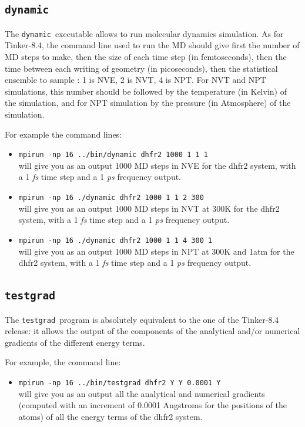 \documentclass[peerreview]{IEEEtran}
\def\dynamic{\texttt{dynamic}}
\def\testgrad{\texttt{testgrad}}
\def\mpirun{\texttt{mpirun -np}}
\begin{document}
\subsection{\dynamic\ }
The \dynamic\ executable allows to run molecular dynamics simulation. As for Tinker-8.4, the command line used to run the MD should give first the number of MD steps to make, then the size of each time step (in femtoseconds), then the time between each writing of geometry (in picoseconds), then the statistical ensemble to sample : 1 is NVE, 2 is NVT, 4 is NPT. For NVT and NPT simulations, this number should be followed by the temperature (in Kelvin) of the simulation, and for NPT simulation by the pressure (in Atmosphere) of the simulation.

For example the command lines:
\begin{itemize}
    \item[] \mpirun\texttt{  16 ../bin/dynamic dhfr2 1000 1 1 1} \\
    will give you as an output 1000 MD steps in NVE for the dhfr2 system, with a 1  {\em fs} time step and a 1 {\em ps} frequency output.
    \item[] \mpirun\texttt{  16 ./dynamic dhfr2 1000 1 1 2 300} \\
    will give you as an output 1000 MD steps in NVT at 300K for the dhfr2 system, with a 1  {\em fs} time step and a 1  {\em ps} frequency output.
    \item[] \mpirun\texttt{  16 ./dynamic dhfr2 1000 1 1 4 300 1} \\
    will give you as an output 1000 MD steps in NPT at 300K and 1atm for the dhfr2 system, with a 1  {\em fs} time step and a 1  {\em ps} frequency output.
\end{itemize}
\subsection{\testgrad\ }
The \testgrad\ program is absolutely equivalent to the one of the Tinker-8.4 release: it allows the output of the components of the analytical and/or numerical gradients of the different energy terms.

For example, the command line:
\begin{itemize}
\item []\mpirun\texttt{  16 ../bin/testgrad dhfr2 Y Y 0.0001 Y} \\
will give you as an output all the analytical and numerical gradients (computed with an increment of 0.0001 Angstroms for the positions of the atoms) of all the energy terms of the dhfr2 system.
\end{itemize}
\end{document}
